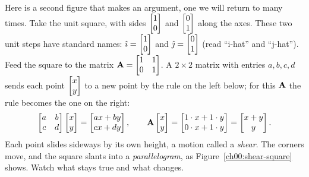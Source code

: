 Here is a second figure that makes an argument, one we will return to many times.
Take the unit square, with sides $\begin{bmatrix}1\\0\end{bmatrix}$ and $\begin{bmatrix}0\\1\end{bmatrix}$ along the axes.
These two unit steps have standard names: $\hat{\imath}=\begin{bmatrix}1\\0\end{bmatrix}$ and
$\hat{\jmath}=\begin{bmatrix}0\\1\end{bmatrix}$ (read ``i-hat'' and ``j-hat''). Feed the square to the
matrix $\mathbf{A}=\begin{bmatrix}1 & 1 \\ 0 & 1\end{bmatrix}$. A $2\times 2$ matrix with entries
$a,b,c,d$ sends each point $\begin{bmatrix}x\\y\end{bmatrix}$ to a new point by the rule on the left
below; for this $\mathbf{A}$ the rule becomes the one on the right:
\[
\begin{bmatrix}a & b \\ c & d\end{bmatrix}\begin{bmatrix}x\\y\end{bmatrix} = \begin{bmatrix}ax+by \\ cx+dy\end{bmatrix},
\qquad
\mathbf{A}\begin{bmatrix}x\\y\end{bmatrix} = \begin{bmatrix}1\cdot x + 1\cdot y \\ 0\cdot x + 1\cdot y\end{bmatrix} = \begin{bmatrix}x+y \\ y\end{bmatrix}.
\]
Each point slides sideways by its own height, a motion called a
\emph{shear}. The corners move, and the square slants into a
\emph{parallelogram}, as Figure~\ref{ch00:shear-square} shows. Watch what stays
true and what changes.

